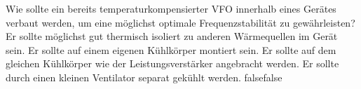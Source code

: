     {Wie sollte ein bereits temperaturkompensierter VFO innerhalb eines Gerätes verbaut werden, um eine möglichst optimale Frequenzstabilität zu gewährleisten?}
    {Er sollte möglichst gut thermisch isoliert zu anderen Wärmequellen im Gerät sein.}
    {Er sollte auf einem eigenen Kühlkörper montiert sein.}
    {Er sollte auf dem gleichen Kühlkörper wie der Leistungsverstärker angebracht werden.}
    {Er sollte durch einen kleinen Ventilator separat gekühlt werden. }
    {false}{false}